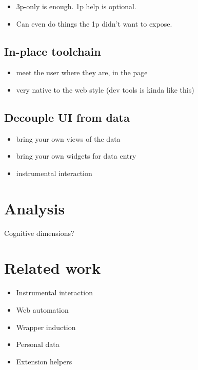 \documentclass[english,submission]{programming}
\providecommand{\tightlist}{%
  \setlength{\itemsep}{0pt}\setlength{\parskip}{0pt}}
\begin{document}
\begin{itemize}
\tightlist
\item
  3p-only is enough. 1p help is optional.
\item
  Can even do things the 1p didn't want to expose.
\end{itemize}

\hypertarget{in-place-toolchain}{%
\subsection{In-place toolchain}\label{in-place-toolchain}}

\begin{itemize}
\tightlist
\item
  meet the user where they are, in the page
\item
  very native to the web style (dev tools is kinda like this)
\end{itemize}

\hypertarget{decouple-ui-from-data}{%
\subsection{Decouple UI from data}\label{decouple-ui-from-data}}

\begin{itemize}
\tightlist
\item
  bring your own views of the data
\item
  bring your own widgets for data entry
\item
  instrumental interaction
\end{itemize}

\hypertarget{analysis}{%
\section{Analysis}\label{analysis}}

Cognitive dimensions?

\hypertarget{related-work}{%
\section{Related work}\label{related-work}}

\begin{itemize}
\tightlist
\item
  Instrumental interaction
\item
  Web automation
\item
  Wrapper induction
\item
  Personal data
\item
  Extension helpers
\end{itemize}
\end{document}
